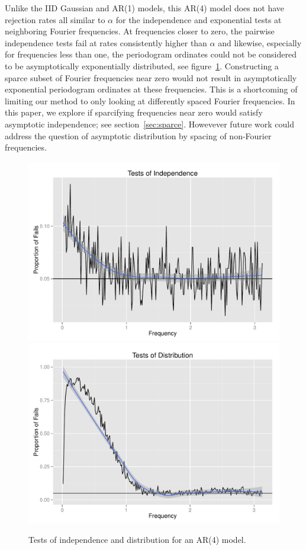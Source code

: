 \documentclass{article}\usepackage{graphicx, color}
\newenvironment{knitrout}{}{} %
\theoremstyle{plain}
\begin{document}
Unlike the IID Gaussian and AR(1) models, this AR(4) model does not have rejection rates all similar to $\alpha$ for the independence and exponential tests at neighboring Fourier frequencies. At frequencies closer to zero, the pairwise independence tests fail at rates consistently higher than $\alpha$ and likewise, especially for frequencies less than one, the periodogram ordinates could not be considered to be asymptotically exponentially distributed, see figure~\ref{fig:tests-ar4}. Constructing a sparce subset of Fourier frequencies near zero would not result in asymptotically exponential periodogram ordinates at these frequencies. This is a shortcoming of limiting our method to only looking at differently spaced Fourier frequencies. In this paper, we explore if sparcifying frequencies near zero would satisfy asymptotic independence; see section~\ref{sec:sparce}. Howevever future work could address the question of asymptotic distribution by spacing of non-Fourier frequencies.

\begin{knitrout}
\color{fgcolor}\begin{figure}[h]

\includegraphics[width=.49\textwidth]{figure/tests-ar41} 
\includegraphics[width=.49\textwidth]{figure/tests-ar42} \caption[Tests of independence and distribution for an AR(4) model]{Tests of independence and distribution for an AR(4) model.\label{fig:tests-ar4}}
\end{figure}


\end{knitrout}
\end{document}
